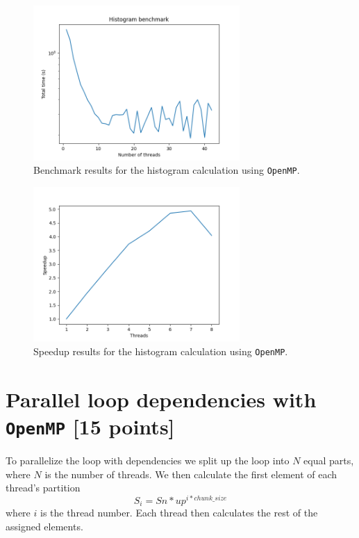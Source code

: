 \documentclass[unicode,11pt,a4paper,oneside,numbers=endperiod,openany]{scrartcl}
\begin{document}
\begin{figure}[h]
    \centering
    \includegraphics[width=0.7\textwidth]{../code/hist/benchmark.png}
    \caption{Benchmark results for the histogram calculation using \texttt{OpenMP}.}
    \label{fig:hist_benchmark}
\end{figure}

\begin{figure}[h]
    \centering
    \includegraphics[width=0.7\textwidth]{../code/hist/speedup.png}
    \caption{Speedup results for the histogram calculation using \texttt{OpenMP}.}
    \label{fig:hist_speedup}
\end{figure}

\section{Parallel loop dependencies with \texttt{OpenMP} [15 points]}

To parallelize the loop with dependencies we split up the loop into $N$ equal parts, where $N$ is the number of threads. We then calculate the first element of each thread's partition
$$S_i = Sn * {up}^{i * chunk\_size}$$
where $i$ is the thread number. Each thread then calculates the rest of the assigned elements.
\end{document}
